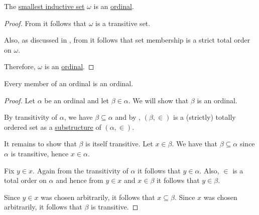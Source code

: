 \begin{proposition}\label{thm:omega_is_an_ordinal}
  The \hyperref[thm:smallest_inductive_set_existence]{smallest inductive set} \( \omega \) is an \hyperref[def:ordinal]{ordinal}.
\end{proposition}
\begin{proof}
  From  it follows that \( \omega \) is a transitive set.

  Also, as discussed in , from  it follows that set membership is a strict total order on \( \omega \).

  Therefore, \( \omega \) is an \hyperref[def:ordinal]{ordinal}.
\end{proof}

\begin{proposition}\label{thm:member_of_ordinal_is_ordinal}
  Every member of an ordinal is an ordinal.
\end{proposition}
\begin{proof}
  Let \( \alpha \) be an ordinal and let \( \beta \in \alpha \). We will show that \( \beta \) is an ordinal.

  By transitivity of \( \alpha \), we have \( \beta \subseteq \alpha \) and by , \( (\beta, \in) \) is a (strictly) totally ordered set as a \hyperref[def:first_order_substructure]{substructure} of \( (\alpha, \in) \).

  It remains to show that \( \beta \) is itself transitive. Let \( x \in \beta \). We have that \( \beta \subseteq \alpha \) since \( \alpha \) is transitive, hence \( x \in \alpha \).

  Fix \( y \in x \). Again from the transitivity of \( \alpha \) it follows that \( y \in \alpha \). Also, \( \in \) is a total order on \( \alpha \) and hence from \( y \in x \) and \( x \in \beta \) it follows that \( y \in \beta \).

  Since \( y \in x \) was chosen arbitrarily, it follows that \( x \subseteq \beta \). Since \( x \) was chosen arbitrarily, it follows that \( \beta \) is transitive.
\end{proof}

